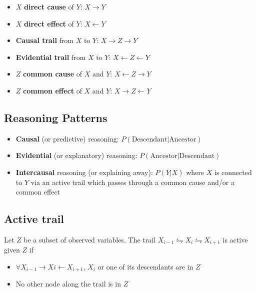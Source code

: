 \documentclass[]{article}
\begin{document}
\begin{itemize}
	\item $X$ \textbf{direct cause} of $Y$: $X \rightarrow Y$
	\item $X$ \textbf{direct effect} of $Y$: $X \leftarrow Y$
	\item \textbf{Causal trail} from $X$ to $Y$: $X \rightarrow Z \rightarrow Y$
	\item \textbf{Evidential trail} from $X$ to $Y$: $X \leftarrow Z \leftarrow Y$
	\item $Z$ \textbf{common cause} of $X$ and $Y$: $X \leftarrow Z \rightarrow Y$
	\item $Z$ \textbf{common effect} of $X$ and $Y$: $X \rightarrow Z \leftarrow Y$
\end{itemize}

\subsection{Reasoning Patterns}

\begin{itemize}
\item \textbf{Causal} (or predictive) reasoning: $P(\text{Descendant} | \text{Ancestor})$
\item \textbf{Evidential} (or explanatory) reasoning: $P(\text{Ancestor} | \text{Descendant})$
\item \textbf{Intercausal} reasoning (or explaining away): $P(Y|X)$ where $X$ is connected to $Y$ via an active trail which passes through a common cause and/or a common effect
\end{itemize}




\subsection{Active trail}

Let $Z$ be a subset of observed variables.
The trail $X_{i-1} \leftrightharpoons X_i \leftrightharpoons X_{i+1}$ is active given $Z$ if
\begin{itemize}
	\item $\forall X_{i-1} \rightarrow Xi \leftarrow X_{i+1}$, $X_i$ or one of its descendants are in $Z$
	\item No other node along the trail is in $Z$
\end{itemize}
\end{document}
